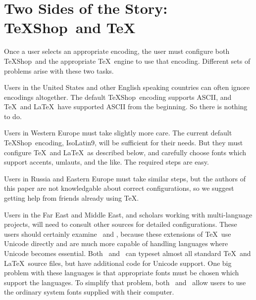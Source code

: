 \documentclass[letterpaper,11pt]{article}
\newcommand{\TS}{\textsf{\TeX Shop}}
\newcommand{\acr}[1]{\textsf{#1}}
\newcommand{\cmd}[1]{\textsf{#1}}
\begin{document}
%

\section{Two Sides of the Story: \TS\ and \TeX}

Once a user selects an appropriate encoding, the user must configure both \TS\ and
the appropriate \TeX\ engine to use that encoding. Different sets of problems arise with these
two tasks. 

Users in the United States and other English speaking countries can often ignore encodings
altogether. The default \TS\ encoding supports \acr{ASCII}, and \TeX\ and \LaTeX\ have supported \acr{ASCII} from the beginning. So there is nothing to do.

Users in Western Europe must take slightly more care. The current default \TS\ encoding,
\acr{IsoLatin9}, will be sufficient for their needs. But they must configure \TeX\ and \LaTeX\ as described below, and carefully choose fonts which support accents, umlauts, and the like.
The required steps are easy.

Users in Russia and Eastern Europe must take similar steps, but the authors of this paper
are not knowledgable about correct configurations, so we suggest getting help from
friends already using \TeX.

Users in the Far East and Middle East, and scholars working with multi-language projects,
will need to consult other sources for detailed configurations. These users should certainly
examine \XeTeX\ and \LuaTeX, because these extensions of \TeX\ use \cmd{Unicode} directly and are
much more capable of handling languages where \cmd{Unicode} becomes essential. Both \XeTeX\ and
\LuaTeX\ can typeset almost all standard \TeX\ and \LaTeX\ source files, but have additional
code for \cmd{Unicode} support. One big problem with these languages is that appropriate fonts must be chosen which support the languages. To simplify that problem,
both \XeTeX\ and \LuaTeX\ allow users to use the ordinary system fonts supplied with their computer.
\end{document}
